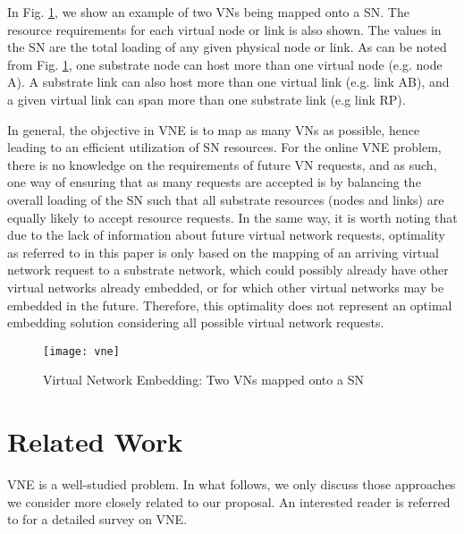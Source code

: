 \documentclass[journal]{IEEEtran}
\begin{document}
In Fig. \ref{vne}, we show an example of two \acp{VN} being mapped onto a \ac{SN}. The resource requirements for each virtual node or link is also shown. The values in the \ac{SN} are the total loading of any given physical node or link. As can be noted from Fig. \ref{vne}, one substrate node can host more than one virtual node (e.g. node A). A substrate link can also host more than one virtual link (e.g. link AB), and a given virtual link can span more than one substrate link (e.g link RP).

In general, the objective in \ac{VNE} is to map as many \acp{VN} as possible, hence leading to an efficient utilization of \ac{SN} resources. For the online \ac{VNE} problem, there is no knowledge on the requirements of future \ac{VN} requests, and as such, one way of ensuring that as many requests are accepted is by balancing the overall loading of the \ac{SN} \cite{Chowdhury12} such that all substrate resources (nodes and links) are equally likely to accept resource requests. In the same way, it is worth noting that due to the lack of information about future virtual network requests, optimality as referred to in this paper is only based on the mapping of an arriving virtual network request to a substrate network, which could possibly already have other virtual networks already embedded, or for which other virtual networks may be embedded in the future. Therefore, this optimality does not represent an optimal embedding solution considering all possible virtual network requests.

\begin{figure}[t!]
 \centering
 \hspace*{-0.25in}
  \texttt{[image: vne]}\\
  \caption{Virtual Network Embedding: Two VNs mapped onto a SN}
  \label{vne}
\end{figure}

\section{Related Work}
\ac{VNE} is a well-studied problem. In what follows, we only discuss those approaches we consider more closely related to our proposal. An interested reader is referred to \cite{Fischer13} for a detailed survey on \ac{VNE}.
\end{document}
